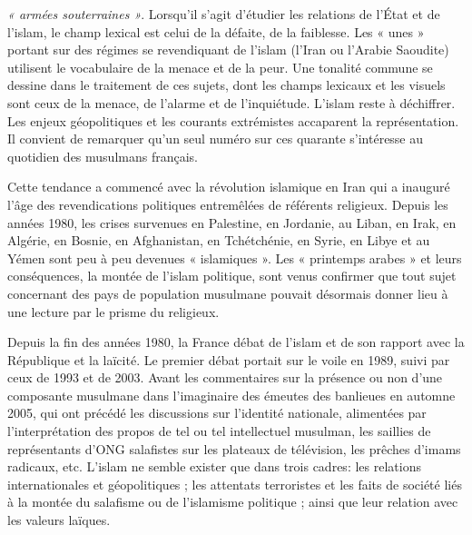 \emph{« armées souterraines »}. Lorsqu'il s'agit d'étudier les relations
de l'État et de l'islam, le champ lexical est celui de la défaite, de la
faiblesse. Les « unes » portant sur des régimes se revendiquant de
l'islam (l'Iran ou l'Arabie Saoudite) utilisent le vocabulaire de la
menace et de la peur. Une tonalité commune se dessine dans le traitement
de ces sujets, dont les champs lexicaux et les visuels sont ceux de la
menace, de l'alarme et de l'inquiétude. L'islam reste à déchiffrer. Les
enjeux géopolitiques et les courants extrémistes accaparent la
représentation. Il convient de remarquer qu'un seul numéro sur ces
quarante s'intéresse au quotidien des musulmans français.


Cette tendance a commencé avec la révolution islamique en Iran qui a
inauguré l'âge des revendications politiques entremêlées de référents
religieux. Depuis les années 1980, les crises survenues en Palestine, en
Jordanie, au Liban, en Irak, en Algérie, en Bosnie, en Afghanistan, en
Tchétchénie, en Syrie, en Libye et au Yémen sont peu à peu devenues «
islamiques ». Les « printemps arabes » et leurs conséquences, la montée
de l'islam politique, sont venus confirmer que tout sujet concernant des
pays de population musulmane pouvait désormais donner lieu à une lecture
par le prisme du religieux.

Depuis la fin des années 1980, la France débat de l'islam et de son
rapport avec la République et la laïcité. Le premier débat portait sur
le voile en 1989, suivi par ceux de 1993 et de 2003. Avant les
commentaires sur la présence ou non d'une composante musulmane dans
l'imaginaire des émeutes des banlieues en automne 2005, qui ont précédé
les discussions sur l'identité nationale, alimentées par
l'interprétation des propos de tel ou tel intellectuel musulman, les
saillies de représentants d'ONG salafistes sur les plateaux de
télévision, les prêches d'imams radicaux, etc. L'islam ne semble exister
que dans trois cadres: les relations internationales et géopolitiques ;
les attentats terroristes et les faits de société liés à la montée du
salafisme ou de l'islamisme politique ; ainsi que leur relation avec les
valeurs laïques.

